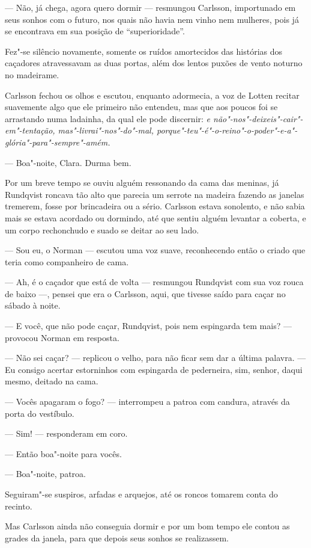 --- Não, já chega, agora quero dormir --- resmungou Carlsson, importunado em seus
sonhos com o futuro, nos quais não havia nem vinho nem mulheres, pois já se encontrava
em sua posição de ``superioridade''.

Fez"-se silêncio novamente, somente os ruídos amortecidos das histórias dos
caçadores atravessavam as duas portas, além dos lentos puxões de vento noturno
no madeirame.

Carlsson fechou os olhos e escutou, enquanto adormecia, a voz de Lotten recitar
suavemente algo que ele primeiro não entendeu, mas que aos poucos foi se
arrastando numa ladainha, da qual ele pode discernir: \textit{e não"-nos"-deixeis"-cair"-em"-tentação, 
mas"-livrai"-nos"-do"-mal, porque"-teu"-é"-o-reino"-o-poder"-e-a"-glória"-para"-sempre"-amém.} 

--- Boa"-noite, Clara. Durma bem.

Por um breve tempo se ouviu alguém ressonando da cama das meninas, já Rundqvist
roncava tão alto que parecia um serrote na madeira fazendo as janelas tremerem,
fosse por brincadeira ou a sério. Carlsson estava sonolento, e não sabia mais se
estava acordado ou dormindo, até que sentiu alguém levantar a coberta, e um
corpo rechonchudo e suado se deitar ao seu lado.

--- Sou eu, o Norman --- escutou uma voz suave, reconhecendo então o criado que
teria como companheiro de cama.

--- Ah, é o caçador que está de volta --- resmungou Rundqvist com sua voz rouca de
baixo ---, pensei que era o Carlsson, aqui, que tivesse saído para caçar no sábado à noite.

--- E você, que não pode caçar, Rundqvist, pois nem espingarda tem mais? ---
provocou Norman em resposta.

--- Não sei caçar? --- replicou o velho, para não ficar sem dar a última palavra.
--- Eu consigo acertar estorninhos com espingarda de pederneira, sim, senhor,
daqui mesmo, deitado na cama.

--- Vocês apagaram o fogo? --- interrompeu a patroa com candura, através da
porta do vestíbulo.

--- Sim! --- responderam em coro.

--- Então boa"-noite para vocês.

--- Boa"-noite, patroa.

Seguiram"-se suspiros, arfadas e arquejos, até os roncos tomarem conta do recinto.

Mas Carlsson ainda não conseguia dormir e por um bom tempo ele contou as grades
da janela, para que depois seus sonhos se realizassem.

